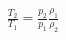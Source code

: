 \documentclass[10pt]{article}
\begin{document}
\begin{align*}\frac{T_{2}}{T_{1}}=\frac{p_{2}}{p_{1}}\frac{\rho_{1}}{\rho_{2}}\end{align*}
\end{document}
